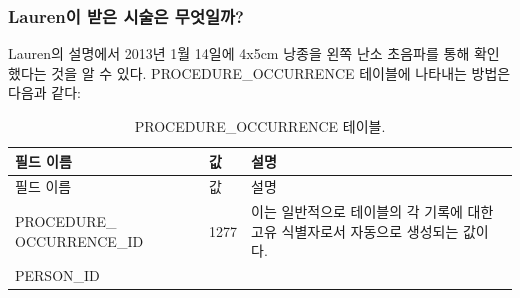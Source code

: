 \documentclass[10.5pt]{book}
\theoremstyle{definition}
\theoremstyle{definition}
\theoremstyle{definition}
\theoremstyle{remark}
\begin{document}
\subsubsection*{Lauren이 받은 시술은 무엇일까?}\label{lauren---}

Lauren의 설명에서 2013년 1월 14일에 4x5cm 낭종을 왼쪽 난소 초음파를 통해
확인했다는 것을 알 수 있다. PROCEDURE\_OCCURRENCE 테이블에 나타내는
방법은 다음과 같다:

\begin{longtable}[]{@{}lll@{}}
\caption{\label{tab:procedureOccurrence} PROCEDURE\_OCCURRENCE
테이블.}\tabularnewline
\toprule
\begin{minipage}[b]{0.28\columnwidth}\raggedright\strut
필드 이름\strut
\end{minipage} & \begin{minipage}[b]{0.16\columnwidth}\raggedright\strut
값\strut
\end{minipage} & \begin{minipage}[b]{0.48\columnwidth}\raggedright\strut
설명\strut
\end{minipage}\tabularnewline
\midrule
\endfirsthead
\toprule
\begin{minipage}[b]{0.28\columnwidth}\raggedright\strut
필드 이름\strut
\end{minipage} & \begin{minipage}[b]{0.16\columnwidth}\raggedright\strut
값\strut
\end{minipage} & \begin{minipage}[b]{0.48\columnwidth}\raggedright\strut
설명\strut
\end{minipage}\tabularnewline
\midrule
\endhead
\begin{minipage}[t]{0.28\columnwidth}\raggedright\strut
PROCEDURE\_ OCCURRENCE\_ID\strut
\end{minipage} & \begin{minipage}[t]{0.16\columnwidth}\raggedright\strut
1277\strut
\end{minipage} & \begin{minipage}[t]{0.48\columnwidth}\raggedright\strut
이는 일반적으로 테이블의 각 기록에 대한 고유 식별자로서 자동으로
생성되는 값이다.\strut
\end{minipage}\tabularnewline
\begin{minipage}[t]{0.28\columnwidth}\raggedright\strut
PERSON\_ID\strut
\end{minipage} & \begin{minipage}[t]{0.16\columnwidth}\raggedright\strut

\end{minipage}
\end{longtable}
\end{document}
